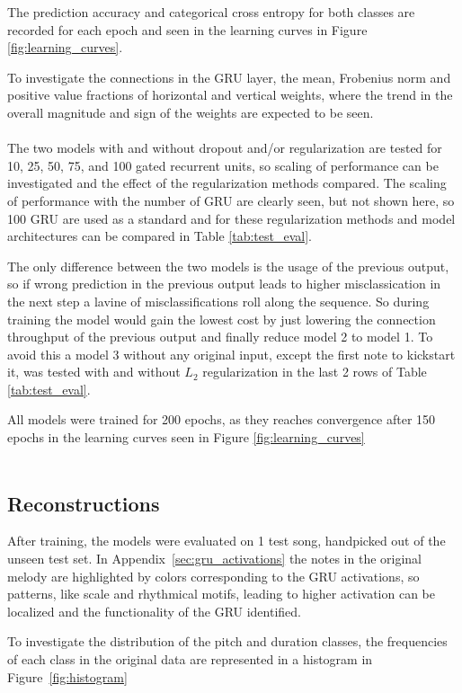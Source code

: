 The prediction accuracy and categorical cross entropy for both classes are recorded for each epoch and seen in the learning curves in Figure \ref{fig:learning_curves}.

To investigate the connections in the GRU layer, the mean, Frobenius norm and positive value fractions of horizontal and vertical weights, where the trend in the overall magnitude and sign of the weights are expected to be seen. \\ \\

The two models with and without dropout and/or regularization are tested for 10, 25, 50, 75, and 100 gated recurrent units, so scaling of performance can be investigated and the effect of the regularization methods compared. The scaling of performance with the number of GRU are clearly seen, but not shown here, so 100 GRU are used as a standard and for these regularization methods and model architectures can be compared in Table \ref{tab:test_eval}.

The only difference between the two models is the usage of the previous output, so if wrong prediction in the previous output leads to higher misclassication in the next step a lavine of misclassifications roll along the sequence. So during training the model would gain the lowest cost by just lowering the connection throughput of the previous output and finally reduce model 2 to model 1. To avoid this a model 3 without any original input, except the first note to kickstart it, was tested with and without $L_2$ regularization in the last 2 rows of Table \ref{tab:test_eval}. 

All models were trained for 200 epochs, as they reaches convergence after 150 epochs in the learning curves seen in Figure \ref{fig:learning_curves}\\ \\

\subsection{Reconstructions}

After training, the models were evaluated on 1 test song, handpicked out of the unseen test set. In Appendix~\ref{sec:gru_activations} the notes in the original melody are highlighted by colors corresponding to the GRU activations, so patterns, like scale and rhythmical motifs, leading to higher activation can be localized and the functionality of the GRU identified.

To investigate the distribution of the pitch and duration classes, the frequencies of each class in the original data are represented in a histogram in Figure~\ref{fig:histogram}

